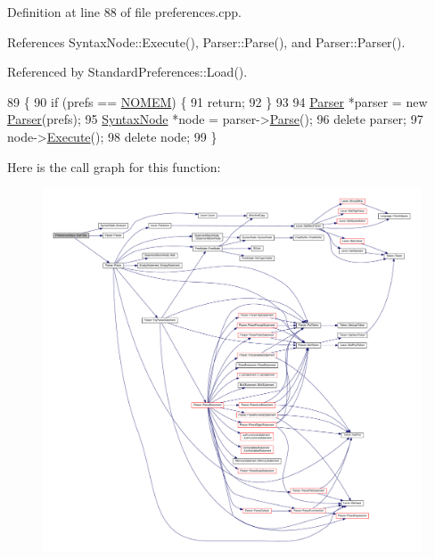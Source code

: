 Definition at line 88 of file preferences.\+cpp.



References Syntax\+Node\+::\+Execute(), Parser\+::\+Parse(), and Parser\+::\+Parser().



Referenced by Standard\+Preferences\+::\+Load().


\begin{DoxyCode}
89 \{
90     \textcolor{keywordflow}{if} (prefs == \hyperlink{platform_8h_a46ff2bfbf0d44b8466a2251d5bd5e6f8}{NOMEM}) \{
91         \textcolor{keywordflow}{return};
92     \}
93 
94     \hyperlink{classParser}{Parser} *parser = \textcolor{keyword}{new} \hyperlink{classParser}{Parser}(prefs);
95     \hyperlink{classSyntaxNode}{SyntaxNode} *node = parser->\hyperlink{classParser_a1861d1d9cc6165970cf07e07cacd11df}{Parse}();
96     \textcolor{keyword}{delete} parser;
97     node->\hyperlink{classSyntaxNode_ad8418608fa224536b48a590c87f0a509}{Execute}();
98     \textcolor{keyword}{delete} node;
99 \}
\end{DoxyCode}


Here is the call graph for this function\+:\nopagebreak
\begin{figure}[H]
\begin{center}
\leavevmode
\includegraphics[width=350pt]{classPreferencesBase_a90dcd05552f94429b05df661eb72b5e2_cgraph}
\end{center}
\end{figure}




